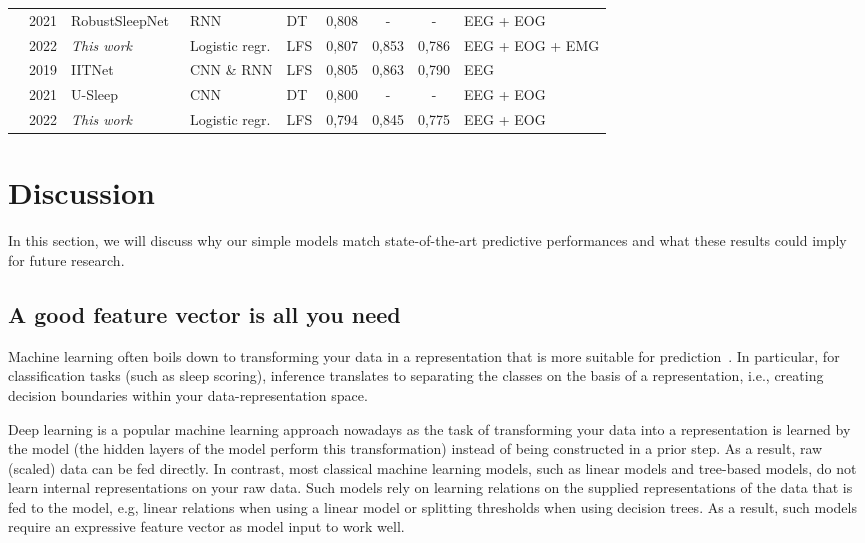 \documentclass[runningheads]{llncs}
\begin{document}
\begin{table}[htbp]
{\begin{tabular}{c|p{}p{}p{}p{}|ccc|l}
 & 2021 & RobustSleepNet~\cite{guillot2021robustsleepnet} & RNN & DT & 0,808 & - & - & EEG + EOG \\
 & 2022 & \textit{This work} & Logistic regr. & LFS & 0,807 & 0,853 & 0,786 & EEG + EOG + EMG \\
 & 2019 & IITNet~\cite{seo2020iitnet} & CNN \& RNN & LFS & 0,805 & 0,863 & 0,790 & EEG \\
 & 2021 & U-Sleep~\cite{perslev2021usleep} & CNN & DT & 0,800 & - & - & EEG + EOG \\
 & 2022 & \textit{This work} & Logistic regr. & LFS & 0,794 & 0,845 & 0,775 & EEG + EOG \\
 \bottomrule
\end{tabular}
}
\end{table}

\section{Discussion}\label{sec:discussion}
In this section, we will discuss why our simple models match state-of-the-art predictive performances and what these results could imply for future research.

\subsection{A good feature vector is all you need}
Machine learning often boils down to transforming your data in a representation that is more suitable for prediction~\cite{domingos2012few}.
In particular, for classification tasks (such as sleep scoring), inference translates to separating the classes on the basis of a representation, i.e., creating decision boundaries within your data-representation space.

Deep learning is a popular machine learning approach nowadays as the task of transforming your data into a representation is learned by the model (the hidden layers of the model perform this transformation) instead of being constructed in a prior step. As a result, raw (scaled) data can be fed directly. In contrast, most classical machine learning models, such as linear models and tree-based models, do not learn internal representations on your raw data. Such models rely on learning relations on the supplied representations of the data that is fed to the model, e.g, linear relations when using a linear model or splitting thresholds when using decision trees.  As a result, such models require an expressive feature vector as model input to work well.
\end{document}
